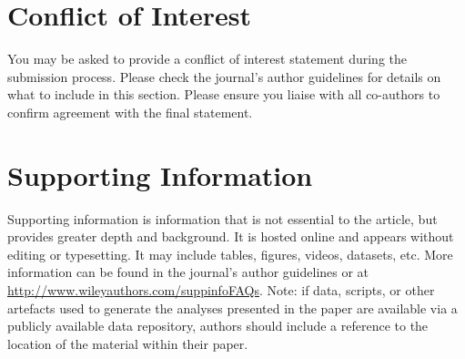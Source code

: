 \documentclass{wiley-article} %
\begin{document}
\section*{Conflict of Interest}
You may be asked to provide a conflict of interest statement during the submission process. Please check the journal's author guidelines for details on what to include in this section. Please ensure you liaise with all co-authors to confirm agreement with the final statement.

\section*{Supporting Information}
Supporting information is information that is not essential to the article, but provides greater depth and background. It is hosted online and appears without editing or typesetting. It may include tables, figures, videos, datasets, etc. More information can be found in the journal's author guidelines or at \url{http://www.wileyauthors.com/suppinfoFAQs}. Note: if data, scripts, or other artefacts used to generate the analyses presented in the paper are available via a publicly available data repository, authors should include a reference to the location of the material within their paper.




\end{document}
